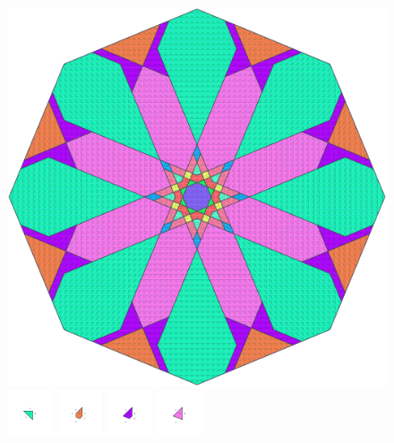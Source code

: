 \documentclass[text.tex]{subfiles}
\begin{document}
\clearpage
\pagestyle{fancy}
\fancyhf{}
\begin{figure}[h!]
\centering
\includegraphics[width=1\textwidth]{img/results/octagon/octagon_216421_(-1_4alpha_4).pdf}
\includegraphics[width=0.12\textwidth]{img/results/octagon/octagon_216421_(-1_4alpha_4)_001.pdf}
\includegraphics[width=0.12\textwidth]{img/results/octagon/octagon_216421_(-1_4alpha_4)_002.pdf}
\includegraphics[width=0.12\textwidth]{img/results/octagon/octagon_216421_(-1_4alpha_4)_003.pdf}
\includegraphics[width=0.12\textwidth]{img/results/octagon/octagon_216421_(-1_4alpha_4)_004.pdf}

\end{figure}
\end{document}
